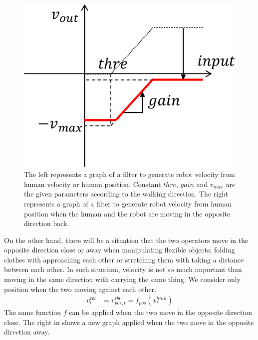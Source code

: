 \begin{figure}[htbp]
\begin{center}
\begin{minipage}{0.45\hsize}
\begin{center}
        \includegraphics[width=1.00\columnwidth]{figs/filter_vel_2}
      \end{center}
    \end{minipage}
    \caption{The left represents a graph of a filter to generate robot velocity from human velocity or human position. Constant \(thre\), \(gain\) and \(v_{max}\) are the given parameters according to the walking direction. The right represents a graph of a filter to generate robot velocity from human position when the human and the robot are moving in the opposite direction back.}
    \label{figure:func_f}
  \end{center}
\end{figure}

On the other hand, there will be a situation that the two operators move in the opposite direction close or away when manipulating flexible objects; folding clothes with approaching each other or stretching them with taking a distance between each other. In such situation, velocity is not so much important than moving in the same direction with carrying the same thing. We consider only position when the two moving against each other.
\begin{align}
v^{rbt}_{t} &= v^{rbt}_{pos,t} = f_{pos}(x^{hmn}_t)
\end{align}
The same function \(f\) can be applied when the two move in the opposite direction close. The right in  shows a new graph applied when the two move in the opposite direction away.\par

